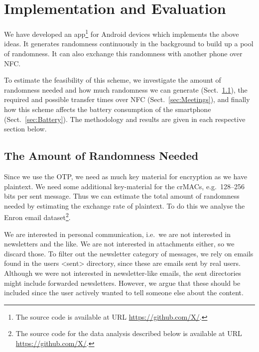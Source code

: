 \section{Implementation and Evaluation}

We have developed an app\footnote{%
  The source code is available at URL \url{https://github.com/X/}.
} for Android devices which implements the above ideas.
It generates randomness continuously in the background to build up a pool of 
randomness.
It can also exchange this randomness with another phone over \ac{NFC}.

To estimate the feasibility of this scheme, we investigate the amount of 
randomness needed and how much randomness we can generate 
(Sect.~\ref{sec:NeededRandomness}), the required and possible transfer times 
over \ac{NFC} (Sect.~\ref{sec:Meetings}), and finally how this scheme affects 
the battery consumption of the smartphone (Sect.~\ref{sec:Battery}).
The methodology and results are given in each respective section below.

\subsection{The Amount of Randomness Needed}
\label{sec:NeededRandomness}
Since we use the \ac{OTP}, we need as much key material for encryption as we 
have plaintext.
We need some additional key-material for the \acp{crMAC}, e.g.~128--256 bits 
per sent message.
Thus we can estimate the total amount of randomness needed by estimating the 
exchange rate of plaintext.
To do this we analyse the Enron email dataset\footnote{%
  The source code for the data analysis described below is available at URL 
  \url{https://github.com/X/}.
}.

We are interested in personal communication, i.e.~we are not interested in 
newsletters and the like.
We are not interested in attachments either, so we discard those.
To filter out the newsletter category of messages, we rely on emails found in 
the users <sent> directory, since these are emails sent by real users.
Although we were not interested in newsletter-like emails, the sent directories 
might include forwarded newsletters.
However, we argue that these should be included since the user actively wanted 
to tell someone else about the content.


